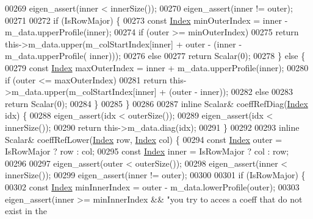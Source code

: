 \begin{DoxyCode}
00269         eigen\_assert(inner < innerSize());
00270         eigen\_assert(inner != outer);
00271 
00272         \textcolor{keywordflow}{if} (IsRowMajor) \{
00273             \textcolor{keyword}{const} \hyperlink{group___core___module_a554f30542cc2316add4b1ea0a492ff02}{Index} minOuterIndex = inner - m\_data.upperProfile(inner);
00274             \textcolor{keywordflow}{if} (outer >= minOuterIndex)
00275                 \textcolor{keywordflow}{return} this->m\_data.upper(m\_colStartIndex[inner] + outer - (inner - m\_data.upperProfile(
      inner)));
00276             \textcolor{keywordflow}{else}
00277                 \textcolor{keywordflow}{return} Scalar(0);
00278         \} \textcolor{keywordflow}{else} \{
00279             \textcolor{keyword}{const} \hyperlink{group___core___module_a554f30542cc2316add4b1ea0a492ff02}{Index} maxOuterIndex = inner + m\_data.upperProfile(inner);
00280             \textcolor{keywordflow}{if} (outer <= maxOuterIndex)
00281                 \textcolor{keywordflow}{return} this->m\_data.upper(m\_colStartIndex[inner] + (outer - inner));
00282             \textcolor{keywordflow}{else}
00283                 \textcolor{keywordflow}{return} Scalar(0);
00284         \}
00285     \}
00286 
00287     \textcolor{keyword}{inline} Scalar& coeffRefDiag(\hyperlink{group___core___module_a554f30542cc2316add4b1ea0a492ff02}{Index} idx) \{
00288         eigen\_assert(idx < outerSize());
00289         eigen\_assert(idx < innerSize());
00290         \textcolor{keywordflow}{return} this->m\_data.diag(idx);
00291     \}
00292 
00293     \textcolor{keyword}{inline} Scalar& coeffRefLower(\hyperlink{group___core___module_a554f30542cc2316add4b1ea0a492ff02}{Index} row, \hyperlink{group___core___module_a554f30542cc2316add4b1ea0a492ff02}{Index} col) \{
00294         \textcolor{keyword}{const} \hyperlink{group___core___module_a554f30542cc2316add4b1ea0a492ff02}{Index} outer = IsRowMajor ? row : col;
00295         \textcolor{keyword}{const} \hyperlink{group___core___module_a554f30542cc2316add4b1ea0a492ff02}{Index} inner = IsRowMajor ? col : row;
00296 
00297         eigen\_assert(outer < outerSize());
00298         eigen\_assert(inner < innerSize());
00299         eigen\_assert(inner != outer);
00300 
00301         \textcolor{keywordflow}{if} (IsRowMajor) \{
00302             \textcolor{keyword}{const} \hyperlink{group___core___module_a554f30542cc2316add4b1ea0a492ff02}{Index} minInnerIndex = outer - m\_data.lowerProfile(outer);
00303             eigen\_assert(inner >= minInnerIndex && \textcolor{stringliteral}{"you try to acces a coeff that do not exist in the
}
\end{DoxyCode}
